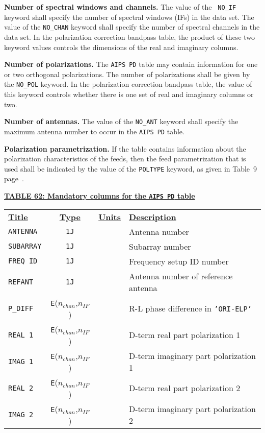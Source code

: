 \documentclass[twoside]{article}
\newcommand{\nif}{$n_{IF}$}
\newcommand{\nchan}{$n_{chan}$}
\begin{document}
{\bf Number of spectral windows and channels.} The value of the {\tt
  NO\_IF} keyword shall specify the number of spectral windows (IFs)
in the data set.  The value of the {\tt NO\_CHAN} keyword shall
specify the number of spectral channels in the data set.  In the
polarization correction bandpass table, the product of these two
keyword values controls the dimensions of the real and imaginary
columns.

{\bf Number of polarizations.}  The {\tt AIPS PD} table may contain
information for one or two orthogonal polarizations.  The number of
polarizations shall be given by the {\tt NO\_POL} keyword.   In the
polarization correction bandpass table, the value of this keyword
controls whether there is one set of real and imaginary columns or
two.

{\bf Number of antennas.} The value of the {\tt NO\_ANT} keyword shall
specify the maximum antenna number to occur in the {\tt AIPS PD} table.

{\bf Polarization parametrization.} If the table contains information
about the polarization characteristics of the feeds, then the feed
parametrization that is used shall be indicated by the value of the
{\tt POLTYPE} keyword, as given in Table~9
page~\pageref{ta:ANpoltypes}.

\begin{center}
\underline{\bf{TABLE 62: Mandatory columns for the {\tt AIPS PD} table}}\\
\begin{tabular}{lcll}
\noalign{\vspace{2pt}} \label{ta:PDcols}
\underline{{\bf Title\vphantom{y}}} & \underline{\bf{Type}} &
   \underline{{\bf Units\vphantom{y}}} & \underline{\bf{Description}} \\
\noalign{\vspace{2pt}}
{\tt ANTENNA}  & {\tt 1J} &      & Antenna number \\
{\tt SUBARRAY} & {\tt 1J} &      & Subarray number \\
{\tt FREQ ID}  & {\tt 1J} &      & Frequency setup ID number \\
{\tt REFANT}   & {\tt 1J} &      & Antenna number of reference antenna \\
{\tt P\_DIFF}  & {\tt E}(\nchan,\nif) & & R-L phase difference in {\tt   'ORI-ELP'} \\
{\tt REAL 1}   & {\tt E}(\nchan,\nif) & & D-term real part polarization 1 \\
{\tt IMAG 1}   & {\tt E}(\nchan,\nif) & & D-term imaginary part polarization 1 \\
\hline
{\tt REAL 2}   & {\tt E}(\nchan,\nif) & & D-term real part polarization 2 \\
{\tt IMAG 2}   & {\tt E}(\nchan,\nif) & & D-term imaginary part polarization 2
\end{tabular}
\end{center}
\end{document}
